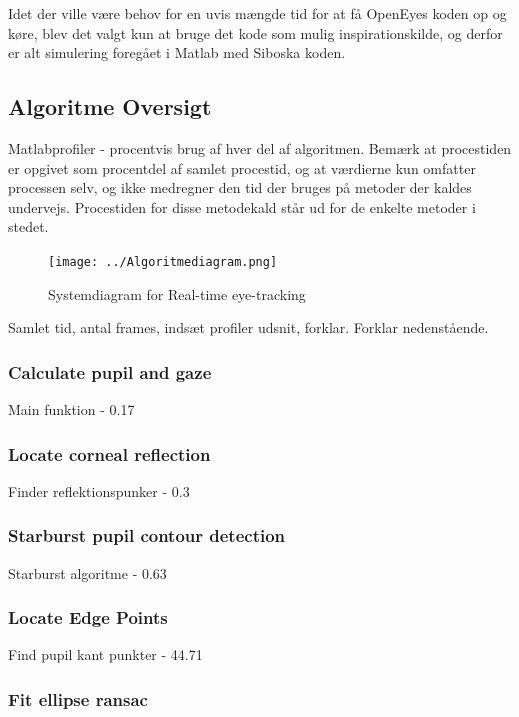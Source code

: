 \documentclass[rapport.tex]{subfiles}
\begin{document}
	Idet der ville være behov for en uvis mængde tid for at få OpenEyes koden op og køre, blev det valgt kun at bruge det kode som mulig inspirationskilde, og derfor er alt simulering foregået i Matlab med Siboska koden.
	
	\subsection{Algoritme Oversigt}
	
	Matlabprofiler - procentvis brug af hver del af algoritmen.
	Bemærk at procestiden er opgivet som procentdel af samlet procestid, og at værdierne kun omfatter processen selv, og ikke medregner den tid der bruges på metoder der kaldes undervejs. Procestiden for disse metodekald står ud for de enkelte metoder i stedet.
	
	\begin{figure}[h]
		\centering
		\texttt{[image: ../Algoritmediagram.png]}
		\caption[Systemdiagram]{Systemdiagram for Real-time eye-tracking}
		\label{fig:Systemdiagram}
	\end{figure}
	
	Samlet tid, antal frames, indsæt profiler udsnit, forklar.
	Forklar nedenstående.
	
	\subsubsection{Calculate pupil and gaze}
	
	Main funktion - 0.17%
	
	\subsubsection{Locate corneal reflection}
	
	Finder reflektionspunker - 0.3%
	
	\subsubsection{Starburst pupil contour detection}
	
	Starburst algoritme - 0.63%
	
	\subsubsection{Locate Edge Points}
	
	Find pupil kant punkter - 44.71%
	
	\subsubsection{Fit ellipse ransac}
	
\end{document}
